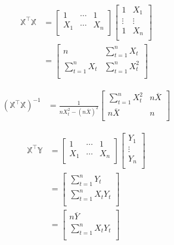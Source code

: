 \documentclass[11pt,french]{report}
\begin{document}
\begin{align*}
\mathbb{X}^\intercal \mathbb{X} &=
\begin{bmatrix} 
1 & \cdots & 1 \\
X_1  & \cdots & X_{n} \\ 
\end{bmatrix}
\begin{bmatrix} 
1 & X_{1} \\
\vdots & \vdots  \\
1 & X_{n} \\ 
\end{bmatrix} \\
&= 
\begin{bmatrix} 
n & \sum_{t=1}^n X_{t} \\
\sum_{t=1}^n X_{t} & \sum_{t=1}^n X_{t}^2 \\ 
\end{bmatrix}
\end{align*}

\begin{align*}
(\mathbb{X}^\intercal \mathbb{X})^{-1} &=
\frac{1}{n X_{t}^2 - (n \overline{X})^2}
\begin{bmatrix} 
\sum_{t=1}^n X_{t}^2  & n \overline{X} \\
n \overline{X} & n \\ 
\end{bmatrix}
\end{align*}

\begin{align*}
\mathbb{X}^\intercal \mathbb{Y} &=
\begin{bmatrix} 
1 & \cdots & 1 \\
X_1  & \cdots & X_{n} \\ 
\end{bmatrix} 
\begin{bmatrix} 
Y_{1} \\
\vdots  \\
Y_{n} \\ 
\end{bmatrix} \\
&=
\begin{bmatrix} 
\sum_{t=1}^n Y_{t} \\
\sum_{t=1}^n X_t Y_{t} \\ 
\end{bmatrix} \\
&= 
\begin{bmatrix} 
n \overline{Y} \\
\sum_{t=1}^n X_t Y_{t} \\ 
\end{bmatrix} \\
\end{align*}
\end{document}
